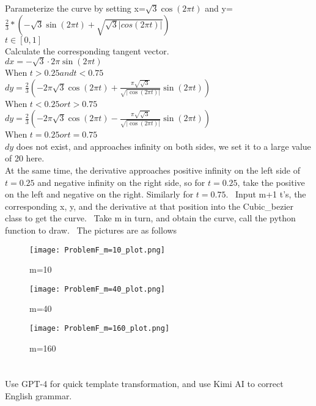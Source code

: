 \documentclass[a4paper]{article}
\begin{document}
    Parameterize the curve by setting x=$\sqrt{3}\cos(2\pi t)$ and y=$\frac{2}{3}*(-\sqrt{3}\sin(2\pi t)+\sqrt{\sqrt{3}|cos(2\pi t)|})$ \\
    $t \in [0,1]$ \\
    Calculate the corresponding tangent vector. \\
    $dx=-\sqrt{3} \cdot 2\pi\sin(2\pi t)$ \\
    When $t>0.25 and t<0.75$ \\
    $dy = \frac{2}{3} \left( -2\pi\sqrt{3}\cos(2\pi t) + \frac{\pi\sqrt{\sqrt{3}}}{\sqrt{|\cos(2\pi t)|}}\sin(2\pi t) \right)$ \\
    When $t<0.25 or t>0.75$ \\
    $dy = \frac{2}{3} \left( -2\pi\sqrt{3}\cos(2\pi t) - \frac{\pi\sqrt{\sqrt{3}}}{\sqrt{|\cos(2\pi t)|}}\sin(2\pi t) \right)$ \\
    When $t=0.25 or t=0.75$ \\
    $dy$ does not exist, and approaches infinity on both sides, we set it to a large value of 20 here. \\
    At the same time, the derivative approaches positive infinity on the left side of $t=0.25$ and negative infinity on the right side, so for $t=0.25$, take the positive on the left and negative on the right. Similarly for $t=0.75$. \
    Input m+1 t's, the corresponding x, y, and the derivative at that position into the Cubic\_bezier class to get the curve. \
    Take m in turn, and obtain the curve, call the python function to draw. \
    The pictures are as follows \
    \begin{figure}[H]
    \centering
    \texttt{[image: ProblemF\_m=10\_plot.png]}
    \caption{m=10}
    \label{fig:example}
    \end{figure}
    \begin{figure}[H]
    \centering
    \texttt{[image: ProblemF\_m=40\_plot.png]}
    \caption{m=40}
    \label{fig:example}
    \end{figure}
    \begin{figure}[H]
    \centering
    \texttt{[image: ProblemF\_m=160\_plot.png]}
    \caption{m=160}
    \label{fig:example}
    \end{figure}
    
    \section*{  }
    Use GPT-4 for quick template transformation, and use Kimi AI to correct English grammar.
    
    
\end{document}
